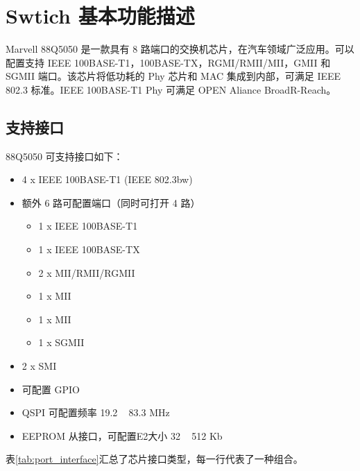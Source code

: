 \section{Swtich 基本功能描述}


Marvell 88Q5050 是一款具有 8 路端口的交换机芯片，在汽车领域广泛应用。可以配置支持 IEEE 100BASE-T1，100BASE-TX，RGMI/RMII/MII，GMII 和 SGMII 端口。该芯片将低功耗的 Phy 芯片和 MAC 
集成到内部，可满足 IEEE 802.3 标准。IEEE 100BASE-T1 Phy 可满足 OPEN Aliance BroadR-Reach。

\subsection{支持接口}
88Q5050 可支持接口如下：
\begin{itemize}
    \item 4 x IEEE 100BASE-T1 (IEEE 802.3bw)
    \item 额外 6 路可配置端口（同时可打开 4 路）
    \begin{itemize}
        \item 1 x IEEE 100BASE-T1
        \item 1 x IEEE 100BASE-TX
        \item 2 x MII/RMII/RGMII
        \item 1 x MII
        \item 1 x MII
        \item 1 x SGMII 
    \end{itemize}
    \item 2 x SMI
    \item 可配置 GPIO
    \item QSPI 可配置频率 19.2 ~ 83.3 MHz
    \item EEPROM 从接口，可配置E2大小 32 ~ 512 Kb
\end{itemize}

表\ref{tab:port_interface}汇总了芯片接口类型，每一行代表了一种组合。

